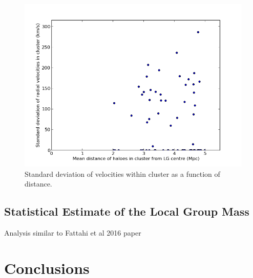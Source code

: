 \documentclass[english, oneside]{HYgradu}
\begin{document}
\begin{figure}
   \centering
   \includegraphics[width=\textwidth]{kuvat/diststd-113.png}
   \caption{Standard deviation of velocities within cluster as a function of distance.}\label{fig:diststd}
\end{figure}

\section{Statistical Estimate of the Local Group Mass}
Analysis similar to Fattahi et al 2016 paper

%
%

\chapter{Conclusions}






\clearpage
{} %


\end{document}
